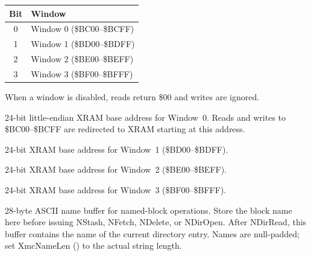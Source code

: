 \begin{center}
\small
\begin{tabular}{@{}cl@{}}
\toprule
\textbf{Bit} & \textbf{Window} \\
\midrule
0 & Window 0 (\$BC00--\$BCFF) \\
1 & Window 1 (\$BD00--\$BDFF) \\
2 & Window 2 (\$BE00--\$BEFF) \\
3 & Window 3 (\$BF00--\$BFFF) \\
\bottomrule
\end{tabular}
\end{center}

When a window is disabled, reads return \$00 and writes are ignored.



24-bit little-endian XRAM base address for Window~0.  Reads and writes to
\$BC00--\$BCFF are redirected to XRAM starting at this address.



24-bit XRAM base address for Window~1 (\$BD00--\$BDFF).



24-bit XRAM base address for Window~2 (\$BE00--\$BEFF).



24-bit XRAM base address for Window~3 (\$BF00--\$BFFF).



28-byte ASCII name buffer for named-block operations.  Store the block name
here before issuing NStash, NFetch, NDelete, or NDirOpen.  After NDirRead,
this buffer contains the name of the current directory entry.  Names are
null-padded; set XmcNameLen () to the actual string length.



